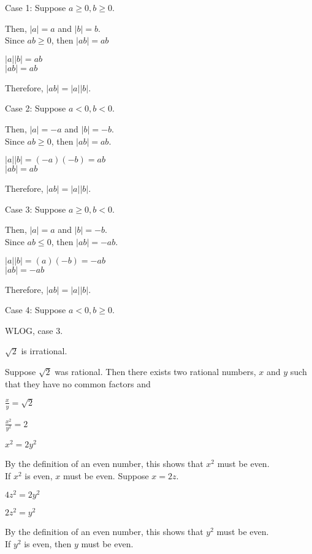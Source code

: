 \documentclass{exam}
\begin{document}
\begin{questions}
\begin{subparts}
\begin{center}
Case 1: Suppose \(a \geq 0, b \geq 0 \).

Then, \(|a| = a\) and \(|b| = b\).\\
Since \( ab \geq 0 \), then \( |ab| = ab \)

\( |a||b| = ab \)\\
\( |ab| = ab \)

Therefore, \( |ab| = |a||b| \).
\vspace{5mm}

Case 2: Suppose \(a < 0, b < 0 \).

Then, \(|a| = -a\) and \(|b| = -b\).\\
Since \( ab \geq 0 \), then \( |ab| = ab \).

\( |a||b| = (-a)(-b) = ab \)\\
\( |ab| = ab \)

Therefore, \( |ab| = |a||b| \).
\vspace{5mm}

Case 3: Suppose \( a \geq 0, b < 0 \).

Then, \(|a| = a\) and \(|b| = -b\).\\
Since \( ab \leq 0 \), then \( |ab| = -ab \).

\( |a||b| = (a)(-b) = -ab \)\\
\( |ab| = -ab \)

Therefore, \( |ab| = |a||b| \).
\vspace{5mm}

Case 4: Suppose \( a < 0, b \geq 0 \).

WLOG, case 3.

\end{center}

\subpart \( \sqrt{2} \) is irrational.

\begin{center}

Suppose \(\sqrt{2}\) was rational. Then there exists two rational numbers, \(x\) and \(y\) such that they have no common factors and

\(\frac{x}{y} = \sqrt{2}\)

\(\frac{x^2}{y^2} = 2\)

\(x^2 = 2y^2\)

By the definition of an even number, this shows that \(x^2\) must be even.\\
If \(x^2\) is even, \(x\) must be even. Suppose \(x = 2z\).

\(4z^2 = 2y^2\)

\(2z^2 = y^2\)

By the definition of an even number, this shows that \(y^2\) must be even.\\
If \(y^2\) is even, then \(y\) must be even.


\end{center}
\end{subparts}
\end{questions}
\end{document}
